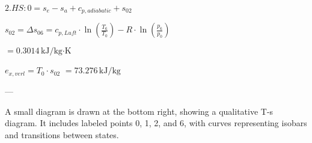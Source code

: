 \( 2. HS: 0 = s_e - s_a + c_{p, adiabatic} + s_{02} \)  

\( s_{02} = \Delta s_{06} = c_{p, Luft} \cdot \ln \left( \frac{T_6}{T_0} \right) - R \cdot \ln \left( \frac{p_6}{p_0} \right) \)  

\( = 0.3014 \, \text{kJ/kg·K} \)  

\( e_{x, verl} = T_0 \cdot s_{02} \)  
\( = 73.276 \, \text{kJ/kg} \)  

---

A small diagram is drawn at the bottom right, showing a qualitative T-s diagram. It includes labeled points 0, 1, 2, and 6, with curves representing isobars and transitions between states.